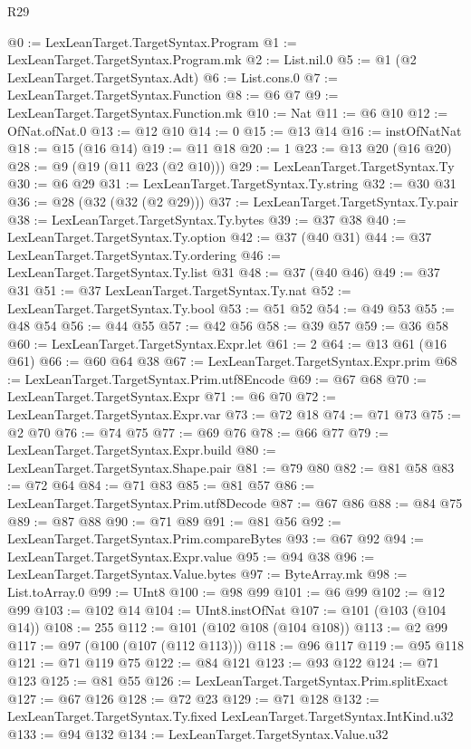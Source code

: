 \begin{lexlean}{R29}
\begin{coremodule}
@0 := LexLeanTarget.TargetSyntax.Program
@1 := LexLeanTarget.TargetSyntax.Program.mk
@2 := List.nil.{0}
@5 := @1 (@2 LexLeanTarget.TargetSyntax.Adt)
@6 := List.cons.{0}
@7 := LexLeanTarget.TargetSyntax.Function
@8 := @6 @7
@9 := LexLeanTarget.TargetSyntax.Function.mk
@10 := Nat
@11 := @6 @10
@12 := OfNat.ofNat.{0}
@13 := @12 @10
@14 := 0
@15 := @13 @14
@16 := instOfNatNat
@18 := @15 (@16 @14)
@19 := @11 @18
@20 := 1
@23 := @13 @20 (@16 @20)
@28 := @9 (@19 (@11 @23 (@2 @10)))
@29 := LexLeanTarget.TargetSyntax.Ty
@30 := @6 @29
@31 := LexLeanTarget.TargetSyntax.Ty.string
@32 := @30 @31
@36 := @28 (@32 (@32 (@2 @29)))
@37 := LexLeanTarget.TargetSyntax.Ty.pair
@38 := LexLeanTarget.TargetSyntax.Ty.bytes
@39 := @37 @38
@40 := LexLeanTarget.TargetSyntax.Ty.option
@42 := @37 (@40 @31)
@44 := @37 LexLeanTarget.TargetSyntax.Ty.ordering
@46 := LexLeanTarget.TargetSyntax.Ty.list @31
@48 := @37 (@40 @46)
@49 := @37 @31
@51 := @37 LexLeanTarget.TargetSyntax.Ty.nat
@52 := LexLeanTarget.TargetSyntax.Ty.bool
@53 := @51 @52
@54 := @49 @53
@55 := @48 @54
@56 := @44 @55
@57 := @42 @56
@58 := @39 @57
@59 := @36 @58
@60 := LexLeanTarget.TargetSyntax.Expr.let
@61 := 2
@64 := @13 @61 (@16 @61)
@66 := @60 @64 @38
@67 := LexLeanTarget.TargetSyntax.Expr.prim
@68 := LexLeanTarget.TargetSyntax.Prim.utf8Encode
@69 := @67 @68
@70 := LexLeanTarget.TargetSyntax.Expr
@71 := @6 @70
@72 := LexLeanTarget.TargetSyntax.Expr.var
@73 := @72 @18
@74 := @71 @73
@75 := @2 @70
@76 := @74 @75
@77 := @69 @76
@78 := @66 @77
@79 := LexLeanTarget.TargetSyntax.Expr.build
@80 := LexLeanTarget.TargetSyntax.Shape.pair
@81 := @79 @80
@82 := @81 @58
@83 := @72 @64
@84 := @71 @83
@85 := @81 @57
@86 := LexLeanTarget.TargetSyntax.Prim.utf8Decode
@87 := @67 @86
@88 := @84 @75
@89 := @87 @88
@90 := @71 @89
@91 := @81 @56
@92 := LexLeanTarget.TargetSyntax.Prim.compareBytes
@93 := @67 @92
@94 := LexLeanTarget.TargetSyntax.Expr.value
@95 := @94 @38
@96 := LexLeanTarget.TargetSyntax.Value.bytes
@97 := ByteArray.mk
@98 := List.toArray.{0}
@99 := UInt8
@100 := @98 @99
@101 := @6 @99
@102 := @12 @99
@103 := @102 @14
@104 := UInt8.instOfNat
@107 := @101 (@103 (@104 @14))
@108 := 255
@112 := @101 (@102 @108 (@104 @108))
@113 := @2 @99
@117 := @97 (@100 (@107 (@112 @113)))
@118 := @96 @117
@119 := @95 @118
@121 := @71 @119 @75
@122 := @84 @121
@123 := @93 @122
@124 := @71 @123
@125 := @81 @55
@126 := LexLeanTarget.TargetSyntax.Prim.splitExact
@127 := @67 @126
@128 := @72 @23
@129 := @71 @128
@132 := LexLeanTarget.TargetSyntax.Ty.fixed LexLeanTarget.TargetSyntax.IntKind.u32
@133 := @94 @132
@134 := LexLeanTarget.TargetSyntax.Value.u32

\end{coremodule}
\end{lexlean}
